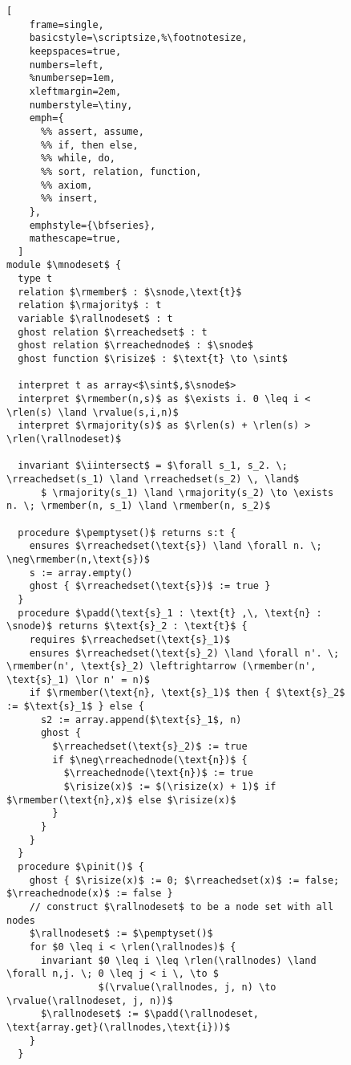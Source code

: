 \begin{figure}
\begin{lstlisting}[
    frame=single,
    basicstyle=\scriptsize,%\footnotesize,
    keepspaces=true,
    numbers=left,
    %numbersep=1em,
    xleftmargin=2em,
    numberstyle=\tiny,
    emph={
      %% assert, assume,
      %% if, then else,
      %% while, do,
      %% sort, relation, function,
      %% axiom,
      %% insert,
    },
    emphstyle={\bfseries},
    mathescape=true,
  ]
module $\mnodeset$ {
  type t
  relation $\rmember$ : $\snode,\text{t}$
  relation $\rmajority$ : t
  variable $\rallnodeset$ : t
  ghost relation $\rreachedset$ : t
  ghost relation $\rreachednode$ : $\snode$
  ghost function $\risize$ : $\text{t} \to \sint$

  interpret t as array<$\sint$,$\snode$>
  interpret $\rmember(n,s)$ as $\exists i. 0 \leq i < \rlen(s) \land \rvalue(s,i,n)$
  interpret $\rmajority(s)$ as $\rlen(s) + \rlen(s) > \rlen(\rallnodeset)$

  invariant $\iintersect$ = $\forall s_1, s_2. \; \rreachedset(s_1) \land \rreachedset(s_2) \, \land$
      $ \rmajority(s_1) \land \rmajority(s_2) \to \exists n. \; \rmember(n, s_1) \land \rmember(n, s_2)$

  procedure $\pemptyset()$ returns s:t {
    ensures $\rreachedset(\text{s}) \land \forall n. \; \neg\rmember(n,\text{s})$
    s := array.empty()
    ghost { $\rreachedset(\text{s})$ := true }
  }
  procedure $\padd(\text{s}_1 : \text{t} ,\, \text{n} : \snode)$ returns $\text{s}_2 : \text{t}$ {
    requires $\rreachedset(\text{s}_1)$
    ensures $\rreachedset(\text{s}_2) \land \forall n'. \; \rmember(n', \text{s}_2) \leftrightarrow (\rmember(n', \text{s}_1) \lor n' = n)$
    if $\rmember(\text{n}, \text{s}_1)$ then { $\text{s}_2$ := $\text{s}_1$ } else {
      s2 := array.append($\text{s}_1$, n)
      ghost {
        $\rreachedset(\text{s}_2)$ := true
        if $\neg\rreachednode(\text{n})$ {
          $\rreachednode(\text{n})$ := true
          $\risize(x)$ := $(\risize(x) + 1)$ if $\rmember(\text{n},x)$ else $\risize(x)$
        }
      }
    }
  }
  procedure $\pinit()$ {
    ghost { $\risize(x)$ := 0; $\rreachedset(x)$ := false; $\rreachednode(x)$ := false }
    // construct $\rallnodeset$ to be a node set with all nodes
    $\rallnodeset$ := $\pemptyset()$
    for $0 \leq i < \rlen(\rallnodes)$ {
      invariant $0 \leq i \leq \rlen(\rallnodes) \land \forall n,j. \; 0 \leq j < i \, \to $
                $(\rvalue(\rallnodes, j, n) \to \rvalue(\rallnodeset, j, n))$
      $\rallnodeset$ := $\padd(\rallnodeset, \text{array.get}(\rallnodes,\text{i}))$
    }
  }


\end{lstlisting}
\end{figure}
